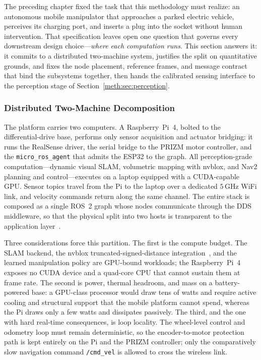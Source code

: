 The preceding chapter fixed the task that this methodology must realize: an autonomous mobile manipulator that approaches a parked electric vehicle, perceives its charging port, and inserts a plug into the socket without human intervention. That specification leaves open one question that governs every downstream design choice---\emph{where each computation runs}. This section answers it: it commits to a distributed two-machine system, justifies the split on quantitative grounds, and fixes the node placement, reference frames, and message contract that bind the subsystems together, then hands the calibrated sensing interface to the perception stage of Section~\ref{meth:sec:perception}.

\subsubsection{Distributed Two-Machine Decomposition}

The platform carries two computers. A Raspberry~Pi~4, bolted to the differential-drive base, performs only sensor acquisition and actuator bridging: it runs the RealSense driver, the serial bridge to the PRIZM motor controller, and the \texttt{micro\_ros\_agent} that admits the ESP32 to the graph. All perception-grade computation---dynamic visual SLAM, volumetric mapping with nvblox, and Nav2 planning and control---executes on a laptop equipped with a CUDA-capable GPU. Sensor topics travel from the Pi to the laptop over a dedicated \ensuremath{5\,\mathrm{GHz}} WiFi link, and velocity commands return along the same channel. The entire stack is composed as a single ROS~2 graph whose nodes communicate through the DDS middleware, so that the physical split into two hosts is transparent to the application layer~\cite{macenski_2022_ros2}.

Three considerations force this partition. The first is the compute budget. The SLAM backend, the nvblox truncated-signed-distance integration~\cite{millane2024nvblox}, and the learned manipulation policy are GPU-bound workloads; the Raspberry~Pi~4 exposes no CUDA device and a quad-core CPU that cannot sustain them at frame rate. The second is power, thermal headroom, and mass on a battery-powered base: a GPU-class processor would draw tens of watts and require active cooling and structural support that the mobile platform cannot spend, whereas the Pi draws only a few watts and dissipates passively. The third, and the one with hard real-time consequences, is loop locality. The wheel-level control and odometry loop must remain deterministic, so the encoder-to-motor protection path is kept entirely on the Pi and the PRIZM controller; only the comparatively slow navigation command \texttt{/cmd\_vel} is allowed to cross the wireless link.

